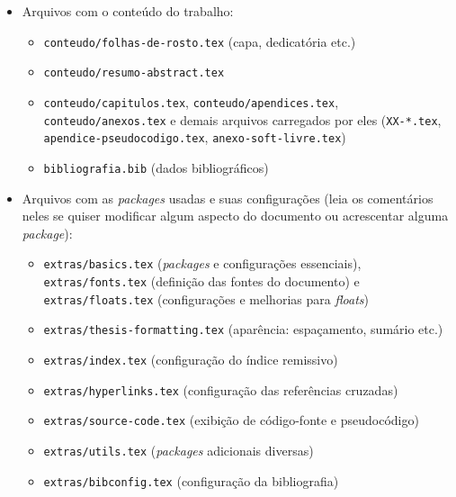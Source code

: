 \begin{itemize}
  \item Arquivos com o conteúdo do trabalho:
  \begin{itemize}
    \item \texttt{conteudo/folhas-de-rosto.tex} (capa, dedicatória etc.)
    \item \texttt{conteudo/resumo-abstract.tex}
    \item \texttt{conteudo/capitulos.tex}, \texttt{conteudo/apendices.tex},
          \texttt{conteudo/anexos.tex} e demais arquivos carregados por eles
          (\texttt{XX-*.tex}, \texttt{apendice-pseudocodigo.tex}, \texttt{anexo-soft-livre.tex})
    \item \texttt{bibliografia.bib} (dados bibliográficos)
  \end{itemize}

  \item Arquivos com as \textit{packages} usadas e suas configurações (leia
        os comentários neles se quiser modificar algum aspecto do
        documento ou acrescentar alguma \textit{package}):
  \begin{itemize}
    \item \texttt{extras/basics.tex} (\textit{packages} e configurações essenciais),
          \texttt{extras/fonts.tex} (definição das fontes do documento) e
          \texttt{extras/floats.tex} (configurações e melhorias para \textit{floats})
    \item \texttt{extras/thesis-formatting.tex} (aparência: espaçamento, sumário etc.)
    \item \texttt{extras/index.tex} (configuração do índice remissivo)
    \item \texttt{extras/hyperlinks.tex} (configuração das referências cruzadas)
    \item \texttt{extras/source-code.tex} (exibição de código-fonte e pseudocódigo)
    \item \texttt{extras/utils.tex} (\textit{packages} adicionais diversas)
    \item \texttt{extras/bibconfig.tex} (configuração da bibliografia)
  \end{itemize}


\end{itemize}
